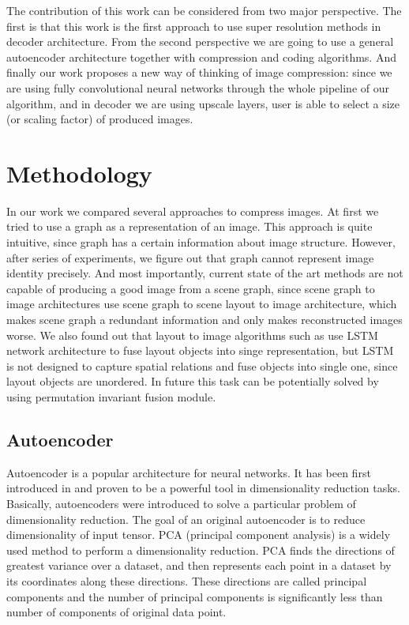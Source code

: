 The contribution of this work can be considered from two major perspective. The first is that this work is the first approach to use super resolution methods in decoder architecture. From the second perspective we are going to use a general autoencoder architecture together with compression and coding algorithms. And finally our work proposes a new way of thinking of image compression: since we are using fully convolutional neural networks through the whole pipeline of our algorithm, and in decoder we are using upscale layers, user is able to select a size (or scaling factor) of produced images.

\chapter{Methodology}

In our work we compared several approaches to compress images. At first we tried to use a graph as a representation of an image. This approach is quite intuitive, since graph has a certain information about image structure. However, after series of experiments, we figure out that graph cannot represent image identity precisely. And most importantly, current state of the art methods are not capable of producing a good image from a scene graph, since scene graph to image architectures use scene graph to scene layout to image architecture, which makes scene graph a redundant information and only makes reconstructed images worse. We also found out that layout to image algorithms such as \cite{Zhao_Meng_Yin_Sigal_2019} use LSTM network architecture to fuse layout objects into singe representation, but LSTM is not designed to capture spatial relations and fuse objects into single one, since layout objects are unordered. In future this task can be potentially solved by using permutation invariant fusion module.

\section{Autoencoder}

Autoencoder is a popular architecture for neural networks. It has been first introduced in \cite{HinSal06} and proven to be a powerful tool in dimensionality reduction tasks. Basically, autoencoders were introduced to solve a particular problem of dimensionality reduction. The goal of an original autoencoder is to reduce dimensionality of input tensor. PCA (principal component analysis) is a widely used method to perform a dimensionality reduction. PCA finds the directions of greatest variance over a dataset, and then represents each point in a dataset by its coordinates along these directions. These directions are called principal components and the number of principal components is significantly less than number of components of original data point.

